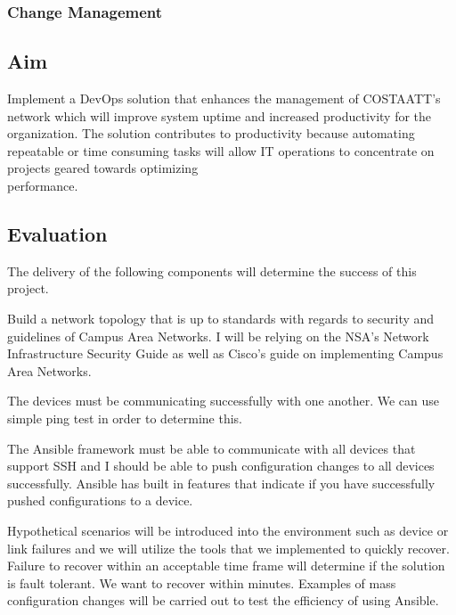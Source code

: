\documentclass[12pt, letterpaper]{article}
\begin{document}
	\subsubsection{Change Management}


\newpage

	\subsection{Aim}
Implement a DevOps solution that enhances the management of COSTAATT's network which will improve system uptime and increased productivity for the organization. The solution contributes to productivity because automating repeatable or time consuming tasks will allow IT operations to concentrate on projects geared towards optimizing \\
performance.

\medskip


	\subsection{Evaluation}
The delivery of the following components will determine the success of this project.

\medskip

Build a network topology that is up to standards with regards to security and guidelines of Campus Area Networks. I will be relying on the NSA’s Network Infrastructure Security Guide as well as Cisco’s guide on implementing Campus Area Networks. 

\medskip

The devices must be communicating successfully with one another. We can use simple ping test in order to determine this. 

\medskip

The Ansible framework must be able to communicate with all devices that support SSH and I should be able to push configuration changes to all devices successfully. Ansible has built in features that indicate if you have successfully pushed configurations to a device. 

\medskip

Hypothetical scenarios will be introduced into the environment such as device or link failures and we will utilize the tools that we implemented to quickly recover. Failure to recover within an acceptable time frame will determine if the solution is fault tolerant. We want to recover within minutes. Examples of mass configuration changes will be carried out to test the efficiency of using Ansible. 
\end{document}
